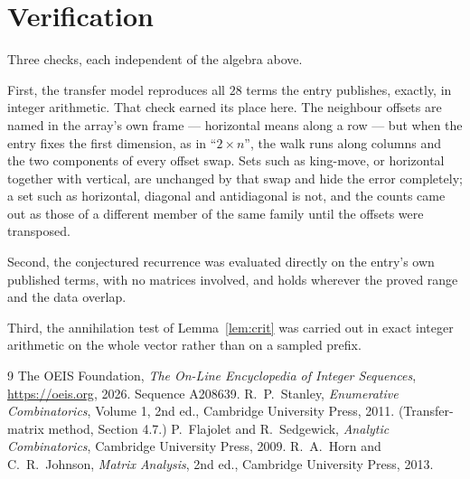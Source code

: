 \documentclass[11pt,a4paper]{article}
\theoremstyle{plain}
\theoremstyle{definition}
\begin{document}
\section{Verification}

Three checks, each independent of the algebra above.

First, the transfer model reproduces all $28$ terms the entry publishes, exactly, in
integer arithmetic. That check earned its place here. The neighbour offsets are named in the
array's own frame --- horizontal means along a row --- but when the entry fixes the first
dimension, as in ``$2\times n$'', the walk runs along columns and the two components of every
offset swap. Sets such as king-move, or horizontal together with vertical, are unchanged by
that swap and hide the error completely; a set such as horizontal, diagonal and antidiagonal
is not, and the counts came out as those of a different member of the same family until the
offsets were transposed.

Second, the conjectured recurrence was evaluated directly on the entry's own published terms,
with no matrices involved, and holds wherever the proved range and the data overlap.

Third, the annihilation test of Lemma~\ref{lem:crit} was carried out in exact integer
arithmetic on the whole vector rather than on a sampled prefix.

\begin{thebibliography}{9}
 The OEIS Foundation, \emph{The On-Line Encyclopedia of Integer
Sequences}, \url{https://oeis.org}, 2026. Sequence A208639.
 R.~P.~Stanley, \emph{Enumerative Combinatorics}, Volume 1, 2nd ed.,
Cambridge University Press, 2011. (Transfer-matrix method, Section 4.7.)
 P.~Flajolet and R.~Sedgewick, \emph{Analytic Combinatorics}, Cambridge
University Press, 2009.
 R.~A.~Horn and C.~R.~Johnson, \emph{Matrix Analysis}, 2nd ed., Cambridge
University Press, 2013.
\end{thebibliography}
\end{document}
